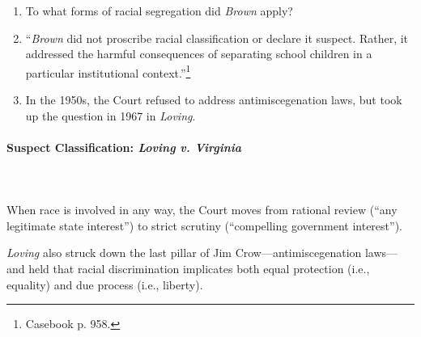 \begin{enumerate}
    \item To what forms of racial segregation did \emph{Brown} apply?
    \item ``\emph{Brown} did not proscribe racial classification or declare it 
    suspect. Rather, it addressed the harmful consequences of separating 
    school children in a particular institutional context.''\footnote{Casebook 
    p. 958.}
    \item In the 1950s, the Court refused to address antimiscegenation laws, 
    but took up the question in 1967 in \emph{Loving}.
\end{enumerate}

\paragraph{Suspect Classification: \emph{Loving v. Virginia}}
~\\\\
When race is involved in any way, the Court moves from rational review (``any 
legitimate state interest'') to strict scrutiny (``compelling government 
interest'').

\emph{Loving} also struck down the last pillar of Jim Crow---antimiscegenation 
laws---and held that racial discrimination implicates both equal protection 
(i.e., equality) and due process (i.e., liberty).

